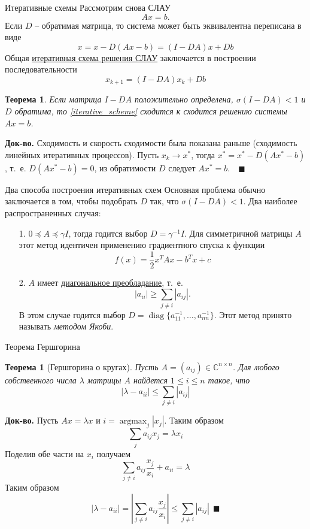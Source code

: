 \documentclass[10pt]{beamer}
\DeclareMathOperator{\argmax}{argmax}
\DeclareMathOperator{\diag}{diag}
\newcounter{thm}
\newtheorem{theorem_ru}[thm]{Теорема}
\begin{document}
\begin{frame}{Итеративные схемы}
Рассмотрим снова СЛАУ 
$$
Ax=b.
$$
\pause
Если $D$ -- обратимая матрица, то система может быть эквивалентна переписана в виде
$$
x=x-D(Ax-b)=(I-DA)x+Db
$$
\pause
Общая \underline{итеративная схема решения СЛАУ} заключается в построении последовательности
\begin{equation}\label{iterative_scheme}
x_{k+1}=(I-DA)x_k+Db
\end{equation}
\pause
\begin{theorem_ru}
Если матрица $I-DA$ положительно определена, $\sigma(I-DA)<1$ и $D$ обратима, то \eqref{iterative_scheme} сходится к сходится решению системы $Ax=b$.
\end{theorem_ru}
\textbf{Док-во.} Сходимость и скорость сходимости была показана раньше (сходимость линейных итеративных процессов). Пусть $x_k\rightarrow x^*$, тогда $x^*=x^*-D(Ax^*-b)$, т.~е. $D(Ax^*-b)=0$, из обратимости $D$ следует $Ax^*=b$.~~$\blacksquare$
\end{frame}

\begin{frame}{Два способа построения итеративных схем}
Основная проблема обычно заключается в том, чтобы подобрать $D$ так, что $\sigma(I-DA)<1$. Два наиболее распространенных случая:
\begin{itemize}[<+->]
\item[1.] $0\preceq A\preceq \gamma I$, тогда годится выбор $D=\gamma^{-1}I$. Для симметричной матрицы $A$ этот метод идентичен применению градиентного спуска к функции
$$
f(x)=\frac{1}{2}x^TAx-b^Tx+c
$$
\item[2.] $A$ имеет \underline{диагональное преобладание}, т.~е.
$$
|a_{ii}|\geq\sum_{j\neq i}|a_{ij}|.
$$	
В этом случае годится выбор $D=\diag\{a_{11}^{-1}, \ldots, a_{nn}^{-1}\}$. Этот метод принято называть \textit{методом Якоби}.
\end{itemize}
\end{frame}

\begin{frame}{Теорема Гершгорина}
\begin{theorem_ru}[Гершгорина о кругах]
Пусть $A=(a_{ij})\in \mathbb{C}^{n\times n}$. Для любого собственного числа $\lambda$ матрицы $A$ найдется $1\leq i\leq n$ такое, что
$$
|\lambda-a_{ii}|\leq \sum_{j\neq i}|a_{ij}|
$$
\end{theorem_ru}
\pause
\textbf{Док-во.} Пусть $Ax=\lambda x$ и $i=\argmax_j|x_j|$. Таким образом
$$
\sum_{j}a_{ij}x_j=\lambda x_i
$$
Поделив обе части на $x_i$ получаем
$$
\sum_{j\neq i}a_{ij}\frac{x_j}{x_i}+a_{ii}=\lambda
$$
\pause
Таким образом
$$
|\lambda-a_{ii}|=\left|\sum_{j\neq i}a_{ij}\frac{x_j}{x_i}\right|\leq \sum_{j\neq i}|a_{ij}|~~\blacksquare
$$
\end{frame}
\end{document}
